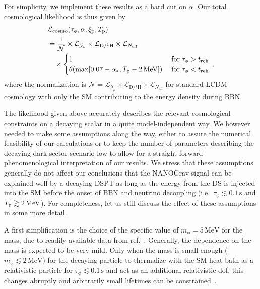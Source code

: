 	For simplicity, we implement these  results as a hard cut on $\alpha$. Our total cosmological likelihood is thus given by
	\begin{align}
		&\mathcal{L}_\text{cosmo}(\tau_\phi, \alpha, \xi_{\text{p}}, T_{\text{p}}) \nonumber \\
		&= \frac{1}{\mathcal{N}} \times \mathcal{L}_{\mathcal{Y}_p} \times \mathcal{L}_{\mathrm{D / {}^1H}} \times \mathcal{L}_{N_\mathrm{eff}} \nonumber \\ & \quad \times \begin{cases}
			1 \; &\text{for} \; \tau_\phi > t_{\text{reh}} \\
			\theta(\max[0.07 - \alpha_*, T_{\text{p}} - 2 \, \mathrm{MeV}]) \; &\text{for} \; \tau_\phi < t_{\text{reh}}
		\end{cases} 
		\,,
	\end{align}
	where the normalization is 
	$\mathcal{N} = \mathcal{L}_{\mathcal{Y}_p} \times \mathcal{L}_{\mathrm{D / {}^1H}} \times \mathcal{L}_{N_\mathrm{eff}}$ 
	for standard \ac{LCDM} cosmology with only the \ac{SM} contributing to the energy density during \ac{BBN}.
	
	The likelihood given above accurately describes the relevant cosmological constraints on a decaying scalar in a quite model-independent way. We however needed to make some assumptions along the way, either to assure the numerical feasibility of our calculations or to keep the number of parameters describing the decaying dark sector scenario low to allow for a straight-forward phenomenological interpretation of our results. We stress that these assumptions generally do not affect our conclusions that the \ac{NANOGrav} signal can be explained well by a decaying \ac{DSPT} as long as the energy from the DS is injected into the SM before the onset of \ac{BBN} and neutrino decoupling (i.e.~$\tau_\phi \lesssim 0.1 \, \mathrm{s}$ and $T_{\text{p}} \gtrsim 2 \, \mathrm{MeV}$). For completeness, let us still discuss the effect of these assumptions in some more detail.
	
	A first simplification is the choice of the specific value of $m_\phi = 5 \, \mathrm{MeV}$ for the mass, due to readily available data from ref.~\cite{Depta:2020zbh}. Generally, the dependence on the mass is expected to be very mild. Only when the mass is  small enough ($m_\phi \lesssim 2 \, \mathrm{MeV}$) for the decaying particle to thermalize with the \ac{SM} heat bath as a relativistic particle for $\tau_\phi \lesssim 0.1 \, \mathrm{s}$ and act as an additional relativistic \ac{dof}, this changes abruptly and arbitrarily small lifetimes can be constrained~\cite{Depta:2020zbh}.
	
